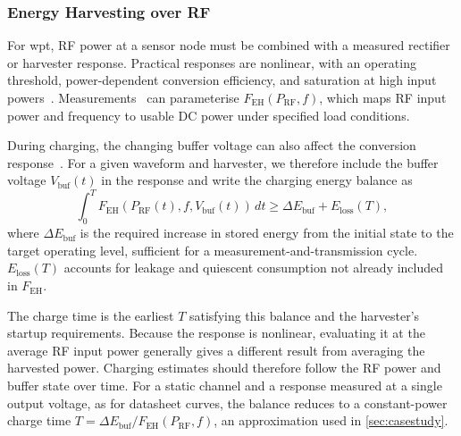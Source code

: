 \subsubsection{Energy Harvesting over RF}
For \gls{wpt}, RF power at a sensor node must be combined with a measured rectifier or harvester response. Practical responses are nonlinear, with an operating threshold, power-dependent conversion efficiency, and saturation at high input powers~\cite{boshkovska2015}. Measurements~\cite{ambient6g} can parameterise $F_{\mathrm{EH}}(P_{\mathrm{RF}},f)$, which maps RF input power and frequency to usable DC power under specified load conditions.

During charging, the changing buffer voltage can also affect the conversion response~\cite{wagih2021}. For a given waveform and harvester, we therefore include the buffer voltage $V_{\mathrm{buf}}(t)$ in the response and write the charging energy balance as
\begin{equation}
 \int_0^T F_{\mathrm{EH}}\!\left(P_{\mathrm{RF}}(t),f,V_{\mathrm{buf}}(t)\right)\,dt
 \geq \Delta E_{\mathrm{buf}}+E_{\mathrm{loss}}(T),
 \label{eq:energy}
\end{equation}
where $\Delta E_{\mathrm{buf}}$ is the required increase in stored energy from the initial state to the target operating level, sufficient for a measurement-and-transmission cycle. $E_{\mathrm{loss}}(T)$ accounts for leakage and quiescent consumption not already included in $F_{\mathrm{EH}}$.

The charge time is the earliest $T$ satisfying this balance and the harvester's startup requirements. Because the response is nonlinear, evaluating it at the average RF input power generally gives a different result from averaging the harvested power. Charging estimates should therefore follow the RF power and buffer state over time. For a static channel and a response measured at a single output voltage, as for datasheet curves, the balance reduces to a constant-power charge time $T=\Delta E_{\mathrm{buf}}/F_{\mathrm{EH}}(P_{\mathrm{RF}},f)$, an approximation used in \cref{sec:casestudy}.


